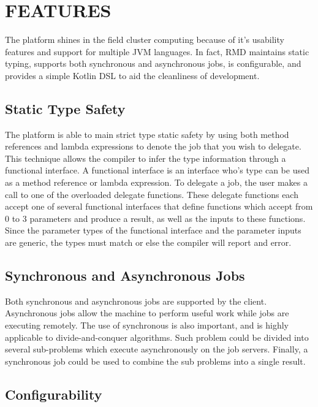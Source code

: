 \section{FEATURES}\label{sec:features}

The platform shines in the field cluster computing because of it's
usability features and support for multiple JVM languages.
In fact, RMD maintains static typing, supports both
synchronous and asynchronous jobs, is configurable, and provides
a simple Kotlin DSL to aid the cleanliness of development.

\subsection{Static Type Safety}\label{subsec:typeSafety}

The platform is able to main strict type static safety by using
both method references and lambda expressions to denote
the job that you wish to delegate.
This technique allows the compiler to infer the type
information through a functional interface.
A functional interface is an interface who's type
can be used as a method reference or lambda expression.
To delegate a job, the user makes a call to one of the overloaded
delegate functions.
These delegate functions each accept one of several functional
interfaces that define functions which accept from 0 to 3 parameters
and produce a result, as well as the inputs to these functions.
Since the parameter types of the functional interface and the parameter inputs
are generic, the types must match or else the compiler will report
and error.


\subsection{Synchronous and Asynchronous Jobs}\label{subsec:synchronousAndAsynchronousJobs}

Both synchronous and asynchronous jobs are supported by the client.
Asynchronous jobs allow the machine to perform useful work
while jobs are executing remotely.
The use of synchronous is also important, and is highly applicable
to divide-and-conquer algorithms.
Such problem could be divided into several sub-problems which
execute asynchronously on the job servers.
Finally, a synchronous job could be used to combine the sub problems
into a single result.


\subsection{Configurability}\label{subsec:configurability}

